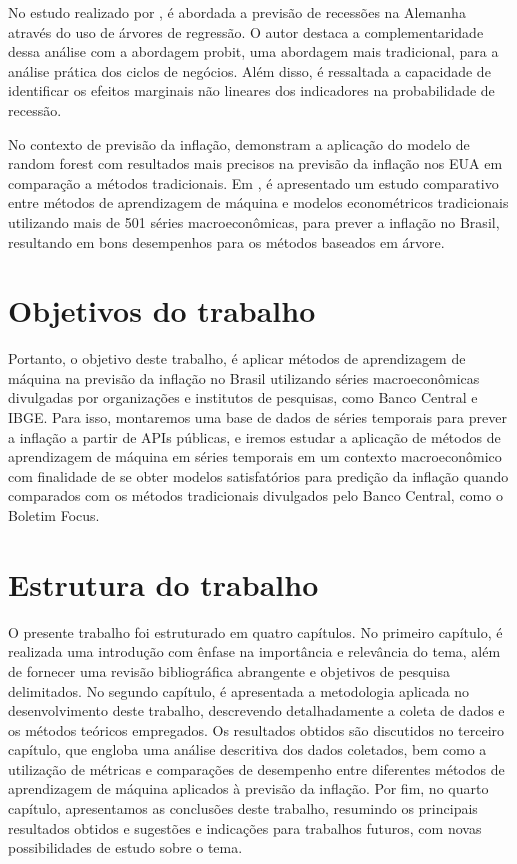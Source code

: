 No estudo realizado por , é abordada a previsão de recessões na Alemanha através do uso de árvores de regressão. O autor destaca a complementaridade dessa análise com a abordagem probit, uma abordagem mais tradicional, para a análise prática dos ciclos de negócios. Além disso, é ressaltada a capacidade de identificar os efeitos marginais não lineares dos indicadores na probabilidade de recessão.

No contexto de previsão da inflação,  demonstram a aplicação do modelo de random forest com resultados mais precisos na previsão da inflação nos EUA em comparação a métodos tradicionais. Em , é apresentado um estudo comparativo entre métodos de aprendizagem de máquina e modelos econométricos tradicionais utilizando mais de 501 séries macroeconômicas, para prever a inflação no Brasil, resultando em bons desempenhos para os métodos baseados em árvore.

\section{Objetivos do trabalho}\label{sec-objetivos}

Portanto, o objetivo deste trabalho, é aplicar métodos de aprendizagem de máquina na previsão da inflação no Brasil utilizando séries macroeconômicas divulgadas por organizações e institutos de pesquisas, como Banco Central e IBGE. Para isso, montaremos uma base de dados de séries temporais para prever a inflação a partir de APIs públicas, e iremos estudar a aplicação de métodos de aprendizagem de máquina em séries temporais em um contexto macroeconômico com finalidade de se obter modelos satisfatórios para predição da inflação quando comparados com os métodos tradicionais divulgados pelo Banco Central, como o Boletim Focus.

\section{Estrutura do trabalho}\label{sec-estrutura}

O presente trabalho foi estruturado em quatro capítulos. No primeiro capítulo, é realizada uma introdução com ênfase na importância e relevância do tema, além de fornecer uma revisão bibliográfica abrangente e objetivos de pesquisa delimitados. No segundo capítulo, é apresentada a metodologia aplicada no desenvolvimento deste trabalho, descrevendo detalhadamente a coleta de dados e os métodos teóricos empregados. Os resultados obtidos são discutidos no terceiro capítulo, que engloba uma análise descritiva dos dados coletados, bem como a utilização de métricas e comparações de desempenho entre diferentes métodos de aprendizagem de máquina aplicados à previsão da inflação. Por fim, no quarto capítulo, apresentamos as conclusões deste trabalho, resumindo os principais resultados obtidos e sugestões e indicações para trabalhos futuros, com novas possibilidades de estudo sobre o tema.